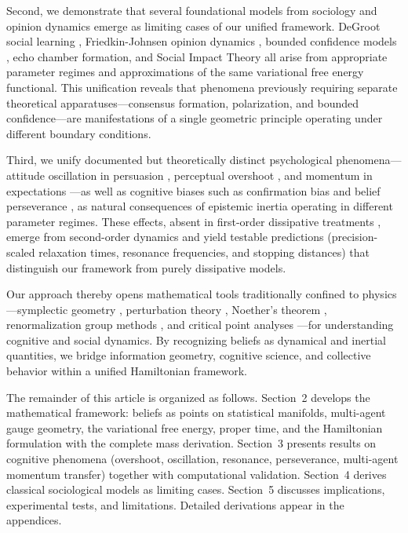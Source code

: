 \documentclass[12pt]{article}
\begin{document}
Second, we demonstrate that several foundational models from sociology and opinion dynamics emerge as limiting cases of our unified framework. DeGroot social learning \citep{degroot1974}, Friedkin-Johnsen opinion dynamics \citep{friedkin1990}, bounded confidence models \citep{hegselmann2002opinion,deffuant2000}, echo chamber formation, and Social Impact Theory \citep{latane1981psychology} all arise from appropriate parameter regimes and approximations of the same variational free energy functional. This unification reveals that phenomena previously requiring separate theoretical apparatuses---consensus formation, polarization, and bounded confidence---are manifestations of a single geometric principle operating under different boundary conditions.

Third, we unify documented but theoretically distinct psychological phenomena---attitude oscillation in persuasion \citep{kaplowitz1992,fink2002}, perceptual overshoot \citep{burge2010,webster2015}, and momentum in expectations \citep{coibion2015}---as well as cognitive biases such as confirmation bias \citep{nickerson1998confirmation} and belief perseverance \citep{anderson1980perseverance}, as natural consequences of epistemic inertia operating in different parameter regimes. These effects, absent in first-order dissipative treatments \citep{parr2022active}, emerge from second-order dynamics and yield testable predictions (precision-scaled relaxation times, resonance frequencies, and stopping distances) that distinguish our framework from purely dissipative models.

Our approach thereby opens mathematical tools traditionally confined to physics---symplectic geometry \citep{arnold1989mathematical}, perturbation theory \citep{holmes2012introduction}, Noether's theorem \citep{olver1993applications}, renormalization group methods \citep{wilson1975renormalization,goldenfeld1992lectures}, and critical point analyses \citep{strogatz2015nonlinear,sornette2006critical}---for understanding cognitive and social dynamics. By recognizing beliefs as dynamical and inertial quantities, we bridge information geometry, cognitive science, and collective behavior within a unified Hamiltonian framework.

The remainder of this article is organized as follows. Section~2 develops the mathematical framework: beliefs as points on statistical manifolds, multi-agent gauge geometry, the variational free energy, proper time, and the Hamiltonian formulation with the complete mass derivation. Section~3 presents results on cognitive phenomena (overshoot, oscillation, resonance, perseverance, multi-agent momentum transfer) together with computational validation. Section~4 derives classical sociological models as limiting cases. Section~5 discusses implications, experimental tests, and limitations. Detailed derivations appear in the appendices.
\end{document}
